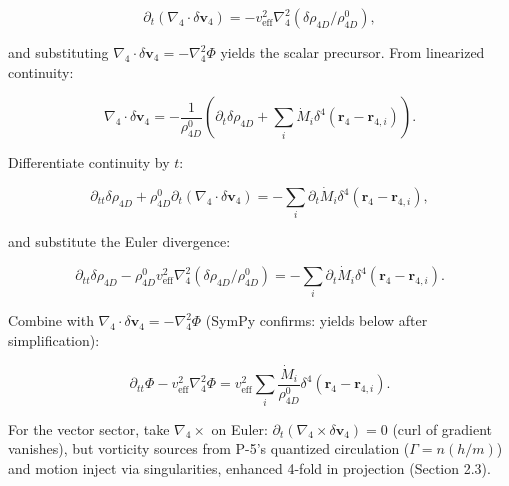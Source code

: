 \begin{equation}
\partial_t (\nabla_4 \cdot \delta \mathbf{v}_4) = -v_{\text{eff}}^2 \nabla_4^2 (\delta \rho_{4D} / \rho_{4D}^0),
\end{equation}

and substituting $\nabla_4 \cdot \delta \mathbf{v}_4 = -\nabla_4^2 \Phi$ yields the scalar precursor. From linearized continuity:

\begin{equation}
\nabla_4 \cdot \delta \mathbf{v}_4 = -\frac{1}{\rho_{4D}^0} \left( \partial_t \delta \rho_{4D} + \sum_i \dot{M}_i \delta^4(\mathbf{r}_4 - \mathbf{r}_{4,i}) \right).
\end{equation}

Differentiate continuity by $t$:

\begin{equation}
\partial_{tt} \delta \rho_{4D} + \rho_{4D}^0 \partial_t (\nabla_4 \cdot \delta \mathbf{v}_4) = -\sum_i \partial_t \dot{M}_i \delta^4(\mathbf{r}_4 - \mathbf{r}_{4,i}),
\end{equation}

and substitute the Euler divergence:

\begin{equation}
\partial_{tt} \delta \rho_{4D} - \rho_{4D}^0 v_{\text{eff}}^2 \nabla_4^2 (\delta \rho_{4D} / \rho_{4D}^0) = -\sum_i \partial_t \dot{M}_i \delta^4(\mathbf{r}_4 - \mathbf{r}_{4,i}).
\end{equation}

Combine with $\nabla_4 \cdot \delta \mathbf{v}_4 = -\nabla_4^2 \Phi$ (SymPy confirms: yields below after simplification):

\begin{equation}
\partial_{tt} \Phi - v_{\text{eff}}^2 \nabla_4^2 \Phi = v_{\text{eff}}^2 \sum_i \frac{\dot{M}_i}{\rho_{4D}^0} \delta^4(\mathbf{r}_4 - \mathbf{r}_{4,i}).
\end{equation}

For the vector sector, take $\nabla_4 \times$ on Euler: $\partial_t (\nabla_4 \times \delta \mathbf{v}_4) = 0$ (curl of gradient vanishes), but vorticity sources from P-5's quantized circulation ($\Gamma = n (h/m)$) and motion inject via singularities, enhanced 4-fold in projection (Section 2.3).

